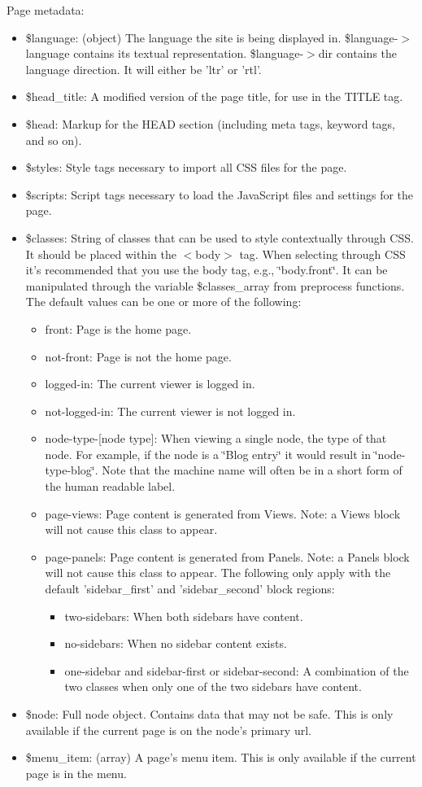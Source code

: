 Page metadata:\begin{itemize}
\item \$language: (object) The language the site is being displayed in. \$language-$>$language contains its textual representation. \$language-$>$dir contains the language direction. It will either be 'ltr' or 'rtl'.\item \$head\_\-title: A modified version of the page title, for use in the TITLE tag.\item \$head: Markup for the HEAD section (including meta tags, keyword tags, and so on).\item \$styles: Style tags necessary to import all CSS files for the page.\item \$scripts: Script tags necessary to load the JavaScript files and settings for the page.\item \$classes: String of classes that can be used to style contextually through CSS. It should be placed within the $<$body$>$ tag. When selecting through CSS it's recommended that you use the body tag, e.g., \char`\"{}body.front\char`\"{}. It can be manipulated through the variable \$classes\_\-array from preprocess functions. The default values can be one or more of the following:\begin{itemize}
\item front: Page is the home page.\item not-front: Page is not the home page.\item logged-in: The current viewer is logged in.\item not-logged-in: The current viewer is not logged in.\item node-type-\mbox{[}node type\mbox{]}: When viewing a single node, the type of that node. For example, if the node is a \char`\"{}Blog entry\char`\"{} it would result in \char`\"{}node-type-blog\char`\"{}. Note that the machine name will often be in a short form of the human readable label.\item page-views: Page content is generated from Views. Note: a Views block will not cause this class to appear.\item page-panels: Page content is generated from Panels. Note: a Panels block will not cause this class to appear. The following only apply with the default 'sidebar\_\-first' and 'sidebar\_\-second' block regions:\begin{itemize}
\item two-sidebars: When both sidebars have content.\item no-sidebars: When no sidebar content exists.\item one-sidebar and sidebar-first or sidebar-second: A combination of the two classes when only one of the two sidebars have content.\end{itemize}
\end{itemize}
\item \$node: Full node object. Contains data that may not be safe. This is only available if the current page is on the node's primary url.\item \$menu\_\-item: (array) A page's menu item. This is only available if the current page is in the menu.\end{itemize}



